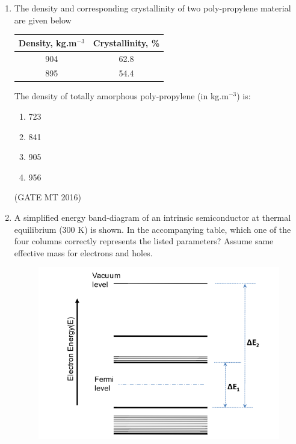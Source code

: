 \documentclass[journal, 11pt, onecolumn]{IEEEtran}
\theoremstyle{remark}
\begin{document}
\begin{enumerate}
\begin{multicols}{4}
\begin{enumerate}
\item $0.36$  
\item $1.55$  
\item $3.65$  
\item $7.30$  
\end{enumerate}
\end{multicols}
\hfill(GATE MT 2016)

\item The density and corresponding crystallinity of two poly-propylene material are given below

\begin{center}
\begin{tabular}{|c|c|}
\hline
Density, kg.m$^{-3}$ & Crystallinity, \% \\
\hline
904 & 62.8 \\
895 & 54.4 \\
\hline
\end{tabular}
\end{center}

The density of totally amorphous poly-propylene (in kg.m$^{-3}$) is:

\begin{multicols}{4}
\begin{enumerate}
\item 723  
\item 841  
\item 905  
\item 956  
\end{enumerate}
\end{multicols}
\hfill(GATE MT 2016)

\item A simplified energy band-diagram of an intrinsic semiconductor at thermal equilibrium (300 K) is shown. In the accompanying table, which one of the four columns correctly represents the listed parameters? Assume same effective mass for electrons and holes.

\begin{figure}[H]
    \centering
    \includegraphics[width=0.5\linewidth]{figs/image5'.png}
    \caption{}
    \label{fig:placeholder}
\end{figure}


\end{enumerate}
\end{document}
